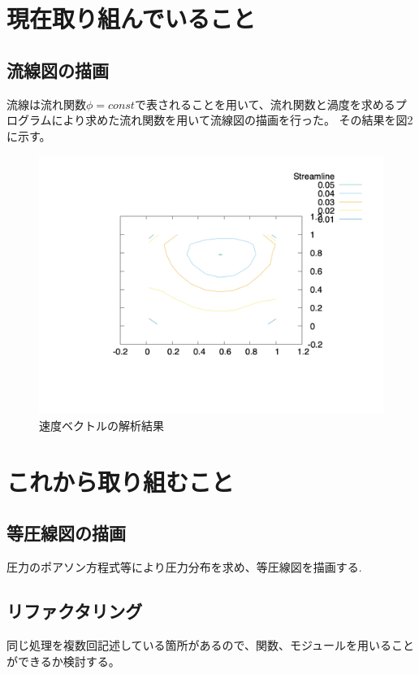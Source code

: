 \documentclass[upLaTeX,a4paper]{jsarticle}
\begin{document}
\section{現在取り組んでいること}
\subsection*{流線図の描画}
流線は流れ関数$\phi = const$で表されることを用いて、流れ関数と渦度を求めるプログラムにより求めた流れ関数を用いて流線図の描画を行った。
その結果を図2に示す。
\begin{figure}[htbp]
  \includegraphics[width=15cm]{outputs/img/stream_line_50.png}
  \caption{速度ベクトルの解析結果}
  \label{stream_line}
\end{figure}
\section{これから取り組むこと}
\subsection{等圧線図の描画}
圧力のポアソン方程式等により圧力分布を求め、等圧線図を描画する.

\subsection{リファクタリング}
同じ処理を複数回記述している箇所があるので、関数、モジュールを用いることができるか検討する。
\end{document}
